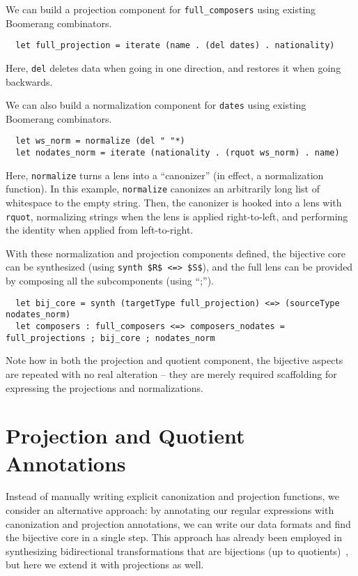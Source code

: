 \documentclass[a4paper]{article}
\begin{document}
We can build a projection component for \lstinline{full_composers} using
existing Boomerang combinators.
%
\begin{lstlisting}
  let full_projection = iterate (name . (del dates) . nationality)
\end{lstlisting}
%
Here, \lstinline{del} deletes data when going in one direction, and restores it
when going backwards.

We can also build a normalization component for \lstinline{dates} using existing
Boomerang combinators.
%
\begin{lstlisting}
  let ws_norm = normalize (del " "*)
  let nodates_norm = iterate (nationality . (rquot ws_norm) . name)
\end{lstlisting}
%
Here, \lstinline{normalize} turns a lens into a ``canonizer'' (in effect, a
normalization function). In this example, \lstinline{normalize} canonizes an
arbitrarily long list of whitespace to the empty string. Then, the canonizer is
hooked into a lens with \lstinline{rquot}, normalizing strings when the lens is
applied right-to-left, and performing the identity when applied from left-to-right.

With these normalization and projection components defined, the bijective core
can be synthesized (using \lstinline{synth $R$ <=> $S$}), and the full lens can be
provided by composing all the subcomponents (using ``;'').
\begin{lstlisting}
  let bij_core = synth (targetType full_projection) <=> (sourceType nodates_norm)
  let composers : full_composers <=> composers_nodates = full_projections ; bij_core ; nodates_norm
\end{lstlisting}

Note how in both the projection and quotient component, the bijective aspects
are repeated with no real alteration -- they are merely required scaffolding
for expressing the projections and normalizations.

\section{Projection and Quotient Annotations}

Instead of manually writing explicit canonization and projection functions, we
consider an alternative approach: by annotating our regular expressions with
canonization and projection annotations, we can write our data formats and find
the bijective core in a single step. This approach has already been employed in
synthesizing bidirectional transformations that are bijections (up to
quotients)~\cite{maina+:quotient-synthesis}, but here we extend it with projections as well.
\end{document}
